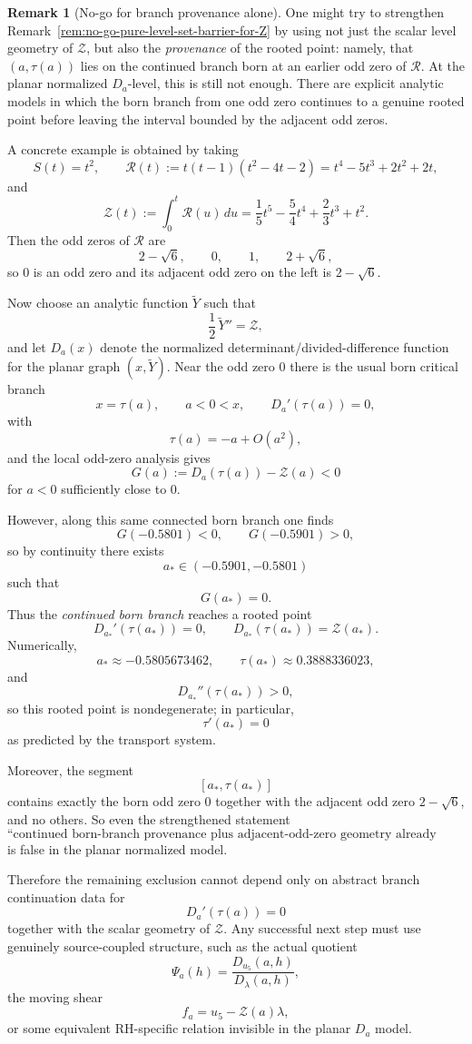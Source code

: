 \documentclass[11pt,a4paper]{amsart}
\theoremstyle{plain}
\theoremstyle{definition}
\newtheorem{remark}[theorem]{Remark}
\begin{document}
\begin{remark}[No-go for branch provenance alone]
\label{rem:no-go-branch-provenance-alone}
One might try to strengthen
Remark~\ref{rem:no-go-pure-level-set-barrier-for-Z}
by using not just the scalar level geometry of $\mathcal Z$, but also the
\emph{provenance} of the rooted point: namely, that $(a,\tau(a))$ lies on the
continued branch born at an earlier odd zero of $\mathcal R$.
At the planar normalized $D_a$-level, this is still not enough. There are
explicit analytic models in which the born branch from one odd zero continues to
a genuine rooted point before leaving the interval bounded by the adjacent odd
zeros.

A concrete example is obtained by taking
\[
S(t)=t^2,
\qquad
\mathcal R(t):=t(t-1)(t^2-4t-2)
=
t^4-5t^3+2t^2+2t,
\]
and
\[
\mathcal Z(t):=\int_0^t \mathcal R(u)\,du
=
\frac15 t^5-\frac54 t^4+\frac23 t^3+t^2.
\]
Then the odd zeros of $\mathcal R$ are
\[
2-\sqrt6,\qquad 0,\qquad 1,\qquad 2+\sqrt6,
\]
so $0$ is an odd zero and its adjacent odd zero on the left is $2-\sqrt6$.

Now choose an analytic function $\widetilde Y$ such that
\[
\frac12\,\widetilde Y''=\mathcal Z,
\]
and let $D_a(x)$ denote the normalized determinant/divided-difference function
for the planar graph $(x,\widetilde Y)$. Near the odd zero $0$ there is the
usual born critical branch
\[
x=\tau(a),
\qquad
a<0<x,
\qquad
D_a'(\tau(a))=0,
\]
with
\[
\tau(a)=-a+O(a^2),
\]
and the local odd-zero analysis gives
\[
G(a):=D_a(\tau(a))-\mathcal Z(a)<0
\]
for $a<0$ sufficiently close to $0$.

However, along this same connected born branch one finds
\[
G(-0.5801)<0,
\qquad
G(-0.5901)>0,
\]
so by continuity there exists
\[
a_*\in(-0.5901,-0.5801)
\]
such that
\[
G(a_*)=0.
\]
Thus the \emph{continued born branch} reaches a rooted point
\[
D_{a_*}'(\tau(a_*))=0,
\qquad
D_{a_*}(\tau(a_*))=\mathcal Z(a_*).
\]
Numerically,
\[
a_*\approx -0.5805673462,
\qquad
\tau(a_*)\approx 0.3888336023,
\]
and
\[
D_{a_*}''(\tau(a_*))>0,
\]
so this rooted point is nondegenerate; in particular,
\[
\tau'(a_*)=0
\]
as predicted by the transport system.

Moreover, the segment
\[
[a_*,\tau(a_*)]
\]
contains exactly the born odd zero $0$ together with the adjacent odd zero
$2-\sqrt6$, and no others. So even the strengthened statement
\[
\text{``continued born-branch provenance plus adjacent-odd-zero geometry
already excludes rooting''}
\]
is false in the planar normalized model.

Therefore the remaining exclusion cannot depend only on abstract branch
continuation data for
\[
D_a'(\tau(a))=0
\]
together with the scalar geometry of $\mathcal Z$. Any successful next step
must use genuinely source-coupled structure, such as the actual quotient
\[
\Psi_a(h)=\frac{D_{u_5}(a,h)}{D_\lambda(a,h)},
\]
the moving shear
\[
f_a=u_5-\mathcal Z(a)\lambda,
\]
or some equivalent RH-specific relation invisible in the planar $D_a$ model.
\end{remark}
\end{document}
